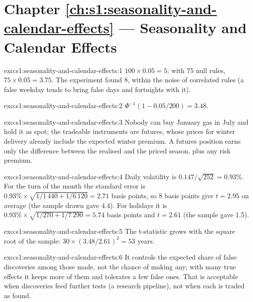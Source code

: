 \section*{Chapter \ref{ch:s1:seasonality-and-calendar-effects} --- Seasonality and Calendar Effects}

\begin{solution}{exo:s1:seasonality-and-calendar-effects:1}
$100 \times 0.05 = 5$; with 75 null rules, $75 \times 0.05 = 3.75$. The experiment found 8, within the noise of correlated rules (a false weekday
tends to bring false days and fortnights with it).
\end{solution}

\begin{solution}{exo:s1:seasonality-and-calendar-effects:2}
$\Phi^{-1}(1 - 0.05/200) = 3.48$.
\end{solution}

\begin{solution}{exo:s1:seasonality-and-calendar-effects:3}
Nobody can buy January gas in July and hold it as spot; the tradeable instruments are futures, whose prices for winter delivery already include the
expected winter premium. A futures position earns only the difference between the realised and the priced season, plus any risk premium.
\end{solution}

\begin{solution}{exo:s1:seasonality-and-calendar-effects:4}
Daily volatility is $0.147/\sqrt{252} = 0.93\%$. For the turn of the month the standard error is $0.93\% \times \sqrt{1/1\,440 + 1/6\,120} = 2.71$ basis
points, so 8 basis points give $t = 2.95$ on average (the sample drawn gave 4.4). For holidays it is $0.93\% \times \sqrt{1/270 + 1/7\,290} = 5.74$
basis points and $t = 2.61$ (the sample gave 1.5).
\end{solution}

\begin{solution}{exo:s1:seasonality-and-calendar-effects:5}
The t-statistic grows with the square root of the sample: $30 \times (3.48/2.61)^2 = 53$ years.
\end{solution}

\begin{solution}{exo:s1:seasonality-and-calendar-effects:6}
It controls the expected share of false discoveries among those made, not the chance of making any; with many true effects it keeps more of them and
tolerates a few false ones. That is acceptable when discoveries feed further tests (a research pipeline), not when each is traded as found.
\end{solution}

